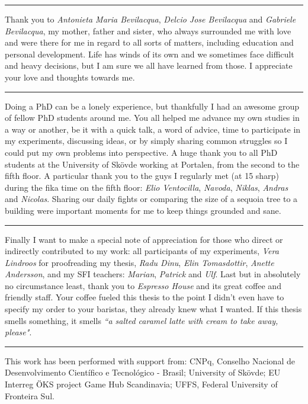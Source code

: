 \vspace{7pt}\hrule\vspace{5pt}

Thank you to \textit{Antonieta Maria Bevilacqua}, \textit{Delcio Jose Bevilacqua} and \textit{Gabriele Bevilacqua}, my mother, father and sister, who always surrounded me with love and were there for me in regard to all sorts of matters, including education and personal development. Life has winds of its own and we sometimes face difficult and heavy decisions, but I am sure we all have learned from those. I appreciate your love and thoughts towards me.

\vspace{7pt}\hrule\vspace{5pt}

Doing a PhD can be a lonely experience, but thankfully I had an awesome group of fellow PhD students around me. You all helped me advance my own studies in a way or another, be it with a quick talk, a word of advice, time to participate in my experiments, discussing ideas, or by simply sharing common struggles so I could put my own problems into perspective. A huge thank you to all PhD students at the University of Sk{\"o}vde working at Portalen, from the second to the fifth floor. A particular thank you to the guys I regularly met (at 15 sharp) during the fika time on the fifth floor: \textit{Elio Ventocilla}, \textit{Navoda}, \textit{Niklas}, \textit{Andras} and \textit{Nicolas}. Sharing our daily fights or comparing the size of a sequoia tree to a building were important moments for me to keep things grounded and sane.

\vspace{7pt}\hrule\vspace{5pt}

Finally I want to make a special note of appreciation for those who direct or indirectly contributed to my work: all participants of my experiments, \textit{Vera Lindroos} for proofreading my thesis, \textit{Radu Dinu}, \textit{Elin Tomasdottir}, \textit{Anette Andersson}, and my SFI teachers: \textit{Marian}, \textit{Patrick} and \textit{Ulf}. Last but in absolutely no circumstance least, thank you to \textit{Espresso House} and its great coffee and friendly staff. Your coffee fueled this thesis to the point I didn't even have to specify my order to your baristas, they already knew what I wanted. If this thesis smells something, it smells \textit{``a salted caramel latte with cream to take away, please"}.

\vspace{7pt}\hrule\vspace{5pt}

This work has been performed with support from: CNPq, Conselho Nacional de Desenvolvimento Cient\'{i}fico e Tecnol\'{o}gico - Brasil; University of Sk\"ovde; EU Interreg \"OKS project Game Hub Scandinavia; UFFS, Federal University of Fronteira Sul.
